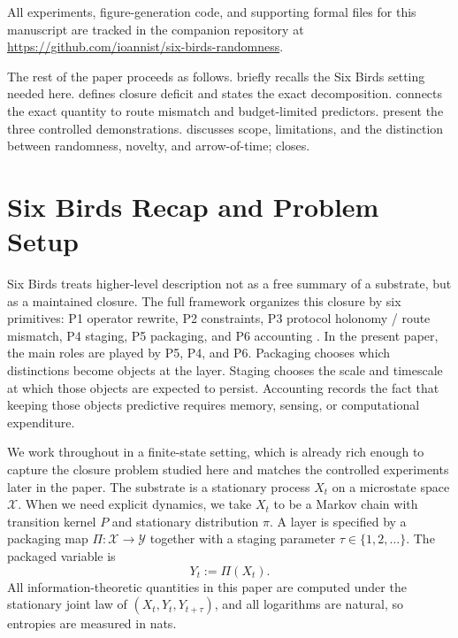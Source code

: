 \documentclass[11pt]{article}
\numberwithin{equation}{section}
\begin{document}
All experiments, figure-generation code, and supporting formal files for this manuscript are tracked in the companion repository at \url{https://github.com/ioannist/six-birds-randomness}.

The rest of the paper proceeds as follows.  briefly recalls the Six Birds setting needed here.  defines closure deficit and states the exact decomposition.  connects the exact quantity to route mismatch and budget-limited predictors.  present the three controlled demonstrations.  discusses scope, limitations, and the distinction between randomness, novelty, and arrow-of-time;  closes.
 \section{Six Birds Recap and Problem Setup}\label{sec:setup}

Six Birds treats higher-level description not as a free summary of a substrate, but as a maintained closure. The full framework organizes this closure by six primitives: P1 operator rewrite, P2 constraints, P3 protocol holonomy / route mismatch, P4 staging, P5 packaging, and P6 accounting \citep{tsiokos2026sixbirds}. In the present paper, the main roles are played by P5, P4, and P6. Packaging chooses which distinctions become objects at the layer. Staging chooses the scale and timescale at which those objects are expected to persist. Accounting records the fact that keeping those objects predictive requires memory, sensing, or computational expenditure.

We work throughout in a finite-state setting, which is already rich enough to capture the closure problem studied here and matches the controlled experiments later in the paper. The substrate is a stationary process $X_t$ on a microstate space $\mathcal{X}$. When we need explicit dynamics, we take $X_t$ to be a Markov chain with transition kernel $P$ and stationary distribution $\pi$. A layer is specified by a packaging map $\Pi : \mathcal{X} \to \mathcal{Y}$ together with a staging parameter $\tau \in \{1,2,\dots\}$. The packaged variable is
\begin{equation}
Y_t := \Pi(X_t).
\label{eq:packaged-process}
\end{equation}
All information-theoretic quantities in this paper are computed under the stationary joint law of $(X_t,Y_t,Y_{t+\tau})$, and all logarithms are natural, so entropies are measured in nats.
\end{document}

